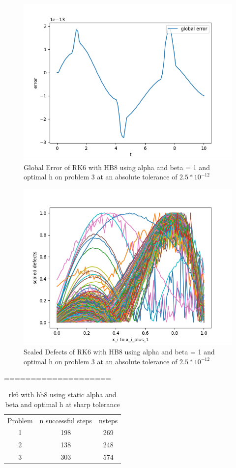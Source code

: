 \documentclass{article}
\begin{document}
\begin{figure}[H]
\centering
\includegraphics[width=0.7\linewidth]{./figures/sharp_tolerance_rk6_with_hb8_p3_global_error}
\caption{Global Error of RK6 with HB8 using alpha and beta = 1 and optimal h on problem 3 at an absolute tolerance of $2.5*10^{-12}$}
\label{fig:sharp_tolerance_rk6_with_hb8_p3_global_error}
\end{figure}

\begin{figure}[H]
\centering
\includegraphics[width=0.7\linewidth]{./figures/sharp_tolerance_rk6_with_hb8_p3_scaled_defects}
\caption{Scaled Defects of RK6 with HB8 using alpha and beta = 1 and optimal h on problem 3 at an absolute tolerance of $2.5*10^{-12}$}
\label{fig:sharp_tolerance_rk6_with_hb8_p3_scaled_defects}
\end{figure}
====================

\begin{table}[h]
\caption {rk6 with hb8 using static alpha and beta and optimal h at sharp tolerance} \label{tab:rk6_with_hb8_sharp_tolerance}
\begin{center}
\begin{tabular}{ c c c } 
Problem & n successful steps      &       nsteps    \\ 
1       & 198                     &        269      \\ 
2       & 138                     &        248      \\
3       & 303                     &        574      \\
\end{tabular}
\end{center}
\end{table}	
\end{document}
